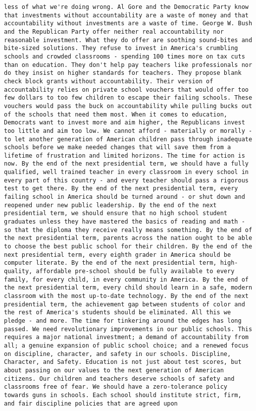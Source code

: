 \documentclass[
]{article}
\begin{document}
\begin{verbatim}
less of what we're doing wrong. Al Gore and the Democratic Party know that investments without accountability are a waste of money and that accountability without investments are a waste of time. George W. Bush and the Republican Party offer neither real accountability nor reasonable investment. What they do offer are soothing sound-bites and bite-sized solutions. They refuse to invest in America's crumbling schools and crowded classrooms - spending 100 times more on tax cuts than on education. They don't help pay teachers like professionals nor do they insist on higher standards for teachers. They propose blank check block grants without accountability. Their version of accountability relies on private school vouchers that would offer too few dollars to too few children to escape their failing schools. These vouchers would pass the buck on accountability while pulling bucks out of the schools that need them most. When it comes to education, Democrats want to invest more and aim higher, the Republicans invest too little and aim too low. We cannot afford - materially or morally - to let another generation of American children pass through inadequate schools before we make needed changes that will save them from a lifetime of frustration and limited horizons. The time for action is now. By the end of the next presidential term, we should have a fully qualified, well trained teacher in every classroom in every school in every part of this country - and every teacher should pass a rigorous test to get there. By the end of the next presidential term, every failing school in America should be turned around - or shut down and reopened under new public leadership. By the end of the next presidential term, we should ensure that no high school student graduates unless they have mastered the basics of reading and math - so that the diploma they receive really means something. By the end of the next presidential term, parents across the nation ought to be able to choose the best public school for their children. By the end of the next presidential term, every eighth grader in America should be computer literate. By the end of the next presidential term, high-quality, affordable pre-school should be fully available to every family, for every child, in every community in America. By the end of the next presidential term, every child should learn in a safe, modern classroom with the most up-to-date technology. By the end of the next presidential term, the achievement gap between students of color and the rest of America's students should be eliminated. All this we pledge - and more. The time for tinkering around the edges has long passed. We need revolutionary improvements in our public schools. This requires a major national investment; a demand of accountability from all; a genuine expansion of public school choice; and a renewed focus on discipline, character, and safety in our schools. Discipline, Character, and Safety. Education is not just about test scores, but about passing on our values to the next generation of American citizens. Our children and teachers deserve schools of safety and classrooms free of fear. We should have a zero-tolerance policy towards guns in schools. Each school should institute strict, firm, and fair discipline policies that are agreed upon 
\end{verbatim}
\end{document}
